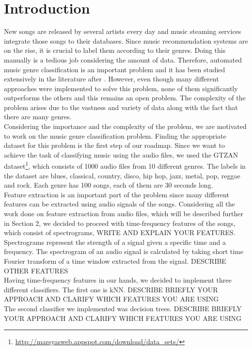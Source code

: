 \documentclass[acmtog, authorversion]{acmart}
\begin{document}
\section{Introduction}
New songs are released by several artists every day and music steaming services integrate those songs to their databases. Since music recommendation systems
are on the rise, it is crucial to label them according to their genres. Doing this manually is a tedious job considering the amount of data. Therefore, automated
music genre classification is an important problem and it has been studied extensively in the literature after \cite{tzanetakis2002musical}.
However, even though many different approaches were implemented to solve this problem, none of them significantly outperforms the others and this remains an
open problem. The complexity of the problem arises due to the vastness and variety of data along with the fact that there are many genres. \\
Considering the importance and the complexity of the problem, we are motivated to work on the music genre classification problem. Finding the appropriate dataset for this problem is the first step of our roadmap. 
Since we want to achieve the task of classifying music using the audio files, we used the GTZAN dataset\footnote{\url{http://marsyasweb.appspot.com/download/data_sets/}}, which consists of 1000 audio files from 10 different
genres. The labels in the dataset are blues, classical, country, disco, hip hop, jazz, metal, pop, reggae and rock. Each genre has 100 songs, each of them are 
30 seconds long. \\
Feature extraction is an important part of the problem since many different features can be extracted using audio signals of the songs.  
Considering all the work done on feature extraction from audio files, which will be described further in Section 2, we decided to proceed with 
time-frequency features of the songs, which consist of spectrograms,
WRITE AND EXPLAIN YOUR FEATURES. Spectrograms represent the strength of a signal given a specific time and a frequency. The spectrogram of an audio signal is calculated
by taking short time Fourier transform of a time window extracted from the signal. DESCRIBE OTHER FEATURES\\
Having time-frequency features in our hands, we decided to implement three different classifiers. The first one is kNN. DESCRIBE BRIEFLY YOUR APPROACH AND CLARIFY
WHICH FEATURES YOU ARE USING \\
The second classifier we implemented was decision trees. DESCRIBE BRIEFLY YOUR APPROACH AND CLARIFY WHICH FEATURES YOU ARE USING \\
\end{document}
